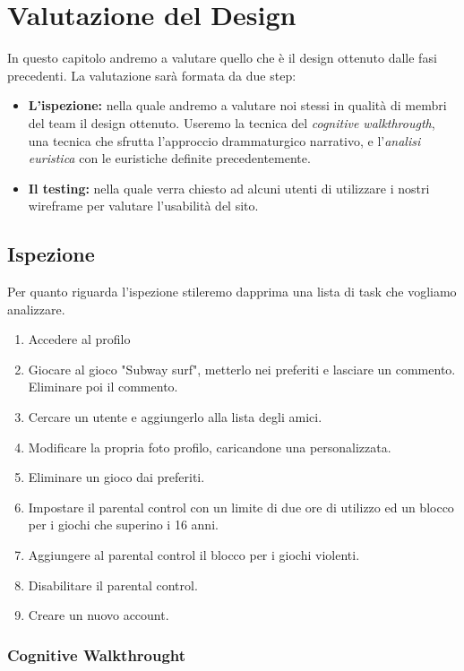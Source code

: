 \documentclass[../Report.tex]{subfiles}
\begin{document}
    \chapter{Valutazione del Design}
    In questo capitolo andremo a valutare quello che è il design ottenuto dalle fasi precedenti. La valutazione sarà formata da due step:
    \begin{itemize}
        \item \textbf{L'ispezione:} nella quale andremo a valutare noi stessi in qualità di membri del team il design ottenuto. Useremo la tecnica del \emph{cognitive walkthrougth}, una tecnica che sfrutta l'approccio drammaturgico narrativo, e l'\emph{analisi euristica} con le euristiche definite precedentemente.
        \item  \textbf{Il testing:} nella quale verra chiesto ad alcuni utenti di utilizzare i nostri wireframe per valutare l'usabilità del sito. 
    \end{itemize}

    \section{Ispezione}
    Per quanto riguarda l'ispezione stileremo dapprima una lista di task che vogliamo analizzare.
    \begin{enumerate}
        \item Accedere al profilo
        \item Giocare al gioco "Subway surf", metterlo nei preferiti e lasciare un commento. Eliminare poi il commento.
        \item Cercare un utente e aggiungerlo alla lista degli amici.
        \item Modificare la propria foto profilo, caricandone una personalizzata.
        \item Eliminare un gioco dai preferiti.
        \item Impostare il parental control con un limite di due ore di utilizzo ed un blocco per i giochi che superino i 16 anni.
        \item Aggiungere al parental control il blocco per i giochi violenti.
        \item Disabilitare il parental control.
        \item Creare un nuovo account.
    \end{enumerate}
    \subsection{Cognitive Walkthrought}
\end{document}
